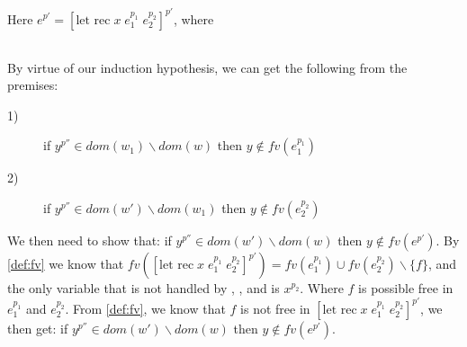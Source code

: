 \item[\runa{Let-rec}] Here $e^{p'}=[\mbox{let rec}\;x\;e_1^{p_1}\;e_2^{p_2}]^{p'}$, where
\begin{figure}[H]
	\setlength\tabcolsep{8pt}
	\begin{tabular}{l}
		
	\end{tabular}
\end{figure}
By virtue of our induction hypothesis, we can get the following from the premises:
\begin{description}
	\item[1)] if $y^{p''}\in dom(w_1)\backslash dom(w)$ then $y\notin fv(e_1^{p_1})$
	\item[2)] if $y^{p''}\in dom(w')\backslash dom(w_1)$ then $y\notin fv(e_2^{p_2})$
\end{description}
We then need to show that: if $y^{p''}\in dom(w')\backslash dom(w)$ then $y\notin fv(e^{p'})$.
By \cref{def:fv} we know that $fv([\mbox{let rec}\;x\;e_1^{p_1}\;e_2^{p_2}]^{p'})=fv(e_1^{p_1})\cup fv(e_2^{p_2})\backslash\{f\}$, and the only variable that is not handled by , , and  is $x^{p_2}$.
Where $f$ is possible free in $e_1^{p_1}$ and $e_2^{p_2}$.
From \cref{def:fv}, we know that $f$ is not free in $[\mbox{let rec}\;x\;e_1^{p_1}\;e_2^{p_2}]^{p'}$, we then get: if $y^{p''}\in dom(w')\backslash dom(w)$ then $y\notin fv(e^{p'})$.
